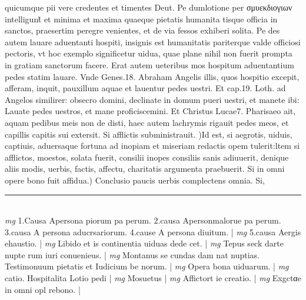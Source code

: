 \documentclass{article}
\begin{document}
\begin{pages}
quicumque pii vere credentes et timentes Deut. Pe dumlotione per σμυεκδιογιων intelligunt̃ et minima et maxima quaeque pietatis humanita tisque officia in sanctos, praesertim peregre venientes, et de via fessos exhiberi solita. Pe des autem lauare aduentanti hospiti, insignis est humanitatis pariterque valde officiosi pectoris, vt hoc exemplo significetur uidua, quae plane nihil non fuerit prompta in gratiam sanctorum facere. Erat autem ueteribus mos hospitum aduentantium pedes  statim lauare. Vnde Genes.18. Abraham Angelis illis, quos hospitio excepit, afferam, inquit, pauxillum aquae et lauentur pedes uestri. Et cap.19. Loth. ad Angelos similirer: obsecro domini, declinate in domum pueri uestri, et manete ibi: Lauate pedes uestros, et mane proficiscemini. Et Christus Lucae7. Pharisaeo ait, aquam pedibus meis non de disti, haec autem lachrymis rigauit pedes meos, et capillis capitis sui extersit.  \pend\pstart Si afflictis subministrauit. )Id est, si aegrotis, uiduis, captiuis, aduersaque fortuna ad inopiam et miseriam redactis opem tulerit:ltem si afflictos, moestos, solata fuerit, consilii inopes consiliis sanis adiuuerit, denique aliis modis, uerbis, factis, affectu, charitatis argumenta praebuerit.  \pend\pstart Si in omni opere bono fuit affidua.) Conclusio paucis uerbis complectens omnia. Si,  \pend
\vspace{0.5cm}\noindent
\vspace{0.2cm}\rule{1cm}{0.2pt}\\ 
\hspace{0.2cm}\textit{mg}
\footnotesize 1.Causa Apersona piorum pa perum. 2.causa Apersonmalorue pa perum. 3.causa A persona aducrsariorum. 4.cause A persona diuitum. 
\normalsize| 
\hspace{0.2cm}\textit{mg}
\footnotesize 5.causa Aergis ehaustio. 
\normalsize| 
\hspace{0.2cm}\textit{mg}
\footnotesize Libido et is continentia uiduas dede cet. 
\normalsize| 
\hspace{0.2cm}\textit{mg}
\footnotesize Tepus seck darte nupte rum iuri conuenieus. 
\normalsize| 
\hspace{0.2cm}\textit{mg}
\footnotesize Montanus se cundas dam nat nuptias. Testimonuum pietatis et Iudicium be norum. 
\normalsize| 
\hspace{0.2cm}\textit{mg}
\footnotesize Opera bona uiduarum. 
\normalsize| 
\hspace{0.2cm}\textit{mg}
\footnotesize catio. Hospitalita Lotio pedi 
\normalsize| 
\hspace{0.2cm}\textit{mg}
\footnotesize Mosuetus 
\normalsize| 
\hspace{0.2cm}\textit{mg}
\footnotesize Affictort ie creatio. 
\normalsize| 
\hspace{0.2cm}\textit{mg}
\footnotesize Exgctαe in omni opl rebono. 
\normalsize| 

\end{pages}
\end{document}
